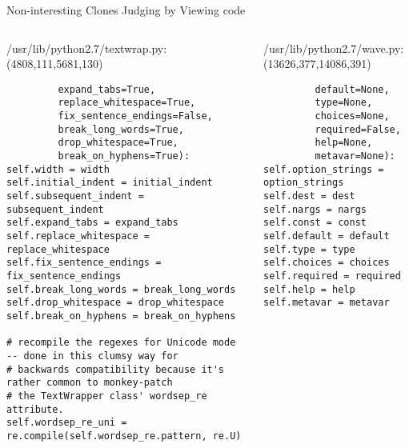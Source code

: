 \begin{frame}[shrink=30,fragile]{Non-interesting Clones Judging by Viewing code}

\lstset{
    breaklines=true,
    language=Python
}

\begin{columns}
\begin{column}[t]{0.48\textwidth}
/usr/lib/python2.7/textwrap.py:(4808,111,5681,130)
\begin{lstlisting}
         expand_tabs=True,
         replace_whitespace=True,
         fix_sentence_endings=False,
         break_long_words=True,
         drop_whitespace=True,
         break_on_hyphens=True):
self.width = width
self.initial_indent = initial_indent
self.subsequent_indent = subsequent_indent
self.expand_tabs = expand_tabs
self.replace_whitespace = replace_whitespace
self.fix_sentence_endings = fix_sentence_endings
self.break_long_words = break_long_words
self.drop_whitespace = drop_whitespace
self.break_on_hyphens = break_on_hyphens

# recompile the regexes for Unicode mode -- done in this clumsy way for
# backwards compatibility because it's rather common to monkey-patch
# the TextWrapper class' wordsep_re attribute.
self.wordsep_re_uni = re.compile(self.wordsep_re.pattern, re.U)
 \end{lstlisting}
\end{column}

\begin{column}[t]{0.48\textwidth}
/usr/lib/python2.7/wave.py:(13626,377,14086,391)
\begin{lstlisting}
         default=None,
         type=None,
         choices=None,
         required=False,
         help=None,
         metavar=None):
self.option_strings = option_strings
self.dest = dest
self.nargs = nargs
self.const = const
self.default = default
self.type = type
self.choices = choices
self.required = required
self.help = help
self.metavar = metavar
\end{lstlisting}

\end{column}
\end{columns}

\end{frame}

